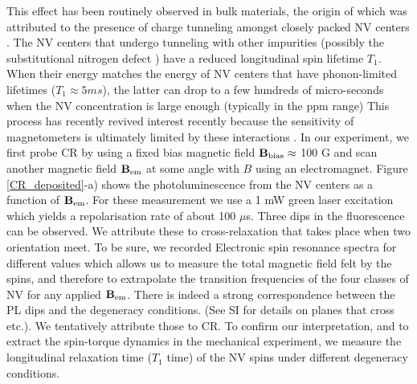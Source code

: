 \documentclass[preprintnumbers,amsmath,amssymb,superscriptaddress,twocolumn,showpacs]{revtex4-1}
\begin{document}
This effect has been routinely observed in bulk materials, the origin of which was attributed to the presence of charge tunneling amongst closely packed NV centers \cite{choi_depolarization_2017}. The NV centers that undergo tunneling with other impurities (possibly the substitutional nitrogen defect \cite{Manson}) have a reduced longitudinal spin lifetime $T_1$. When their energy matches the energy of NV centers that have phonon-limited lifetimes ($T_1\approx 5 ms$), the latter can drop 
to a few hundreds of micro-seconds \cite{Jarmola} when the NV concentration is large enough (typically in the ppm range)
This process has recently revived interest recently because the sensitivity of magnetometers is ultimately limited by these interactions \cite{Zhou}. 
In our experiment, we first probe CR by using a fixed bias magnetic field $\bf B_{\rm bias} \approx$ 100 G and scan another magnetic field $\bf B_{\rm em}$ at some angle with $B$ using an electromagnet. 
Figure \ref{CR_deposited}-a) shows the photoluminescence from the NV centers as a function of $\bf B_{\rm em}$. 
For these measurement we use a 1 mW green laser excitation which yields a repolarisation rate of about 100 $\mu$s. 
Three dips in the fluorescence can be observed. 
We attribute these to cross-relaxation that takes place when two orientation meet. To be sure, we recorded Electronic spin resonance spectra for different values which allows us to measure the total magnetic field felt by the spins, and therefore to extrapolate the transition frequencies of the four classes of NV for any applied $\bf B_{\rm em}$.
There is indeed a strong correspondence between the PL dips and the degeneracy conditions. 
(See SI for details on planes that cross etc.). 
We tentatively attribute those to CR. 
To confirm our interpretation, and to extract the spin-torque dynamics in the mechanical experiment, we measure the longitudinal relaxation time ($T_1$ time) of the NV spins under different degeneracy conditions.
\end{document}
